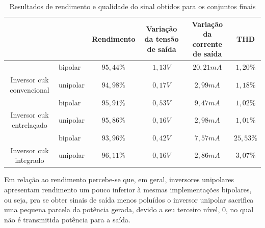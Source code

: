 \documentclass[
	12pt,				%
	openany,
	onseside,
	a4paper,			%
	english,			%
	french,				%
	spanish,			%
	brazil,				%
	]{abntex2}
\begin{document}
\begin{table}[htb]
{\begin{tabular}{|c|l|c|c|c|c|}
		\hline
		\multicolumn{2}{|l|}{\cellcolor[HTML]{FFFFFF}}                                 & Rendimento & \cellcolor[HTML]{FFFFFF}Variação da tensão de saída & \cellcolor[HTML]{FFFFFF}Variação da corrente de saída & \cellcolor[HTML]{FFFFFF}THD \\ \hline
		\rowcolor[HTML]{DBDBDB} 
		\cellcolor[HTML]{FFFFFF}                                            & bipolar  & $95,44\%$  & $1,13V$                                             & $20,21mA$                                             & $1,20\%$                    \\ \cline{2-6} 
		\multirow{-2}{*}{\cellcolor[HTML]{FFFFFF}Inversor cuk convencional} & unipolar & $94,98\%$  & $0,17V$                                             & $2,99mA$                                              & $1,18\%$                    \\ \hline
		\rowcolor[HTML]{DBDBDB} 
		\cellcolor[HTML]{FFFFFF}                                            & bipolar  & $95,91\%$  & $0,53V$                                             & $9,47mA$                                              & $1,02\%$                    \\ \cline{2-6} 
		\multirow{-2}{*}{\cellcolor[HTML]{FFFFFF}Inversor cuk entrelaçado}  & unipolar & $95,86\%$  & $0,16V$                                             & $2,98mA$                                              & $1,01\%$                    \\ \hline
		\rowcolor[HTML]{DBDBDB} 
		\cellcolor[HTML]{FFFFFF}                                            & bipolar  & $93,96\%$  & $0,42V$                                             & $7,57mA$                                              & $25,53\%$                   \\ \cline{2-6} 
		\multirow{-2}{*}{\cellcolor[HTML]{FFFFFF}Inversor cuk integrado}    & unipolar & $96,11\%$  & $0,16V$                                             & $2,86mA$                                              & $3,07\%$                    \\ \hline
		\end{tabular}%
	}
	\caption{Resultados de rendimento e qualidade do sinal obtidos para os conjuntos finais}
	\label{tab:final_results_quality}
\end{table}

Em relação ao rendimento percebe-se que, em geral, inversores unipolares apresentam rendimento um pouco inferior à mesmas implementações bipolares, ou seja, pra se obter sinais de saída menos poluídos o inversor unipolar sacrifica uma pequena parcela da potência gerada, devido a seu terceiro nível, 0, no qual não é transmitida potência para a saída.
\end{document}
